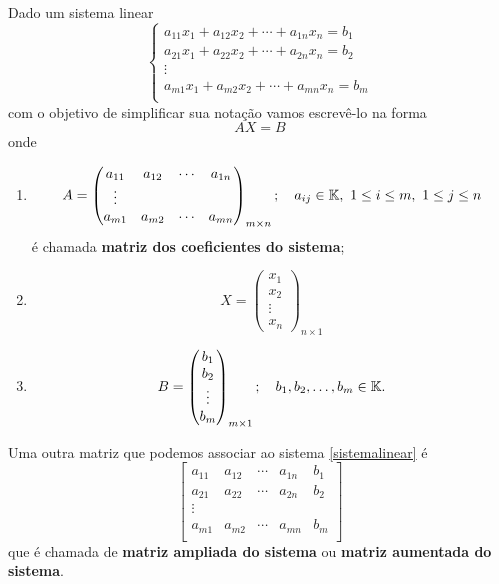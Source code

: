Dado um sistema linear
\begin{equation}
	\begin{cases}
		a_{11}x_1 + a_{12}x_2 + \cdots + a_{1n}x_n = b_1\\
		a_{21}x_1 + a_{22}x_2 + \cdots + a_{2n}x_n = b_2\\
		\vdots
	\\
		a_{m1}x_1 + a_{m2}x_2 + \cdots + a_{mn}x_n = b_m\\
	\end{cases}
\end{equation}
com o objetivo de simplificar sua nota\c{c}\~ao vamos escrev\^e-lo na forma
\begin{equation}\label{formamatricial}
	AX = B
\end{equation}
onde
\begin{enumerate}
	\item
	\[
		A = \begin{pmatrix}
				a_{11} & a_{12} & \cdots & a_{1n}\\
				\vdots\\
				a_{m1} & a_{m2} & \cdots & a_{mn}
		    \end{pmatrix}_{m\times n}; \quad a_{ij} \in \mathbb{K},\ 1 \le i \le m,\ 1 \le j \le n
	\]
	\'e chamada \textbf{matriz dos coeficientes do sistema};
	\item
	\[
		X = \begin{pmatrix}
			x_1\\
			x_2\\
			\vdots\\
			x_n
		\end{pmatrix}_{n \times 1}
	\]
	\item
	\[
		B = \begin{pmatrix}
			b_1\\
			b_2\\
			\vdots\\
			b_m
		\end{pmatrix}_{m \times 1}; \quad b_1, b_2, \dots, b_m \in \mathbb{K}.
	\]
\end{enumerate}

Uma outra matriz que podemos associar ao sistema \eqref{sistemalinear} \'e
\[
	\begin{bmatrix}
		a_{11} & a_{12} & \cdots & a_{1n} & b_1\\
		a_{21} & a_{22} & \cdots & a_{2n} & b_2\\
		\vdots\\
		a_{m1} & a_{m2} & \cdots & a_{mn} & b_m\\
	\end{bmatrix}
\]
que \'e chamada de \textbf{matriz ampliada do sistema} ou \textbf{matriz aumentada do sistema}.

